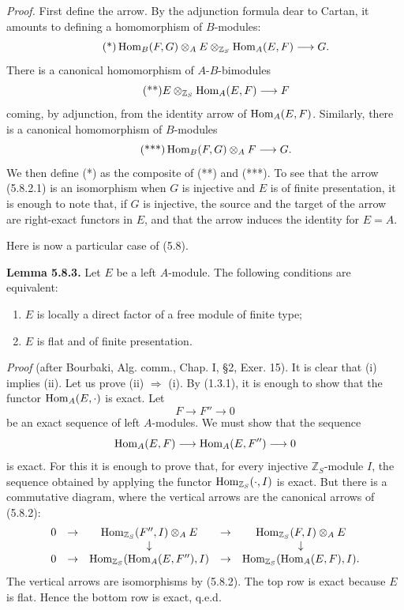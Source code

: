 \documentclass[11pt]{article}
\begin{document}
\emph{Proof.} First define the arrow. By the adjunction formula dear to Cartan, it amounts to defining a homomorphism of \(B\)-modules:
\begin{equation}\tag{*}
  \operatorname{Hom}_B(F,G)\otimes_A E\otimes_{\mathbb Z_S}\operatorname{Hom}_A(E,F)
  \longrightarrow G.
\end{equation}
There is a canonical homomorphism of \(A\)-\(B\)-bimodules
\begin{equation}\tag{**}
  E\otimes_{\mathbb Z_S}\operatorname{Hom}_A(E,F)
  \longrightarrow F
\end{equation}
coming, by adjunction, from the identity arrow of \(\operatorname{Hom}_A(E,F)\). Similarly, there is a canonical homomorphism of \(B\)-modules
\begin{equation}\tag{***}
  \operatorname{Hom}_B(F,G)\otimes_A F\longrightarrow G.
\end{equation}
We then define (*) as the composite of (**) and (***). To see that the arrow (5.8.2.1) is an isomorphism when \(G\) is injective and \(E\) is of finite presentation, it is enough to note that, if \(G\) is injective, the source and the target of the arrow are right-exact functors in \(E\), and that the arrow induces the identity for \(E=A\).

Here is now a particular case of (5.8).

\textbf{Lemma 5.8.3.} Let \(E\) be a left \(A\)-module. The following conditions are equivalent:
\begin{enumerate}[label=(\roman*)]
\item \(E\) is locally a direct factor of a free module of finite type;
\item \(E\) is flat and of finite presentation.
\end{enumerate}

\emph{Proof} (after Bourbaki, Alg. comm., Chap. I, §2, Exer. 15). It is clear that (i) implies (ii). Let us prove (ii) \(\Rightarrow\) (i). By (1.3.1), it is enough to show that the functor \(\operatorname{Hom}_A(E,\cdot)\) is exact. Let
\[
  F\longrightarrow F''\longrightarrow 0
\]
be an exact sequence of left \(A\)-modules. We must show that the sequence
\[
  \operatorname{Hom}_A(E,F)\longrightarrow \operatorname{Hom}_A(E,F'')\longrightarrow 0
\]
is exact. For this it is enough to prove that, for every injective \(\mathbb Z_S\)-module \(I\), the sequence obtained by applying the functor \(\operatorname{Hom}_{\mathbb Z_S}(\cdot,I)\) is exact. But there is a commutative diagram, where the vertical arrows are the canonical arrows of (5.8.2):
\[
\begin{array}{ccccccccc}
0&\to&\operatorname{Hom}_{\mathbb Z_S}(F'',I)\otimes_A E&\to&\operatorname{Hom}_{\mathbb Z_S}(F,I)\otimes_A E\\
&&\downarrow&&\downarrow\\
0&\to&\operatorname{Hom}_{\mathbb Z_S}(\operatorname{Hom}_A(E,F''),I)&\to&\operatorname{Hom}_{\mathbb Z_S}(\operatorname{Hom}_A(E,F),I).
\end{array}
\]
The vertical arrows are isomorphisms by (5.8.2). The top row is exact because \(E\) is flat. Hence the bottom row is exact, q.e.d.
\end{document}
